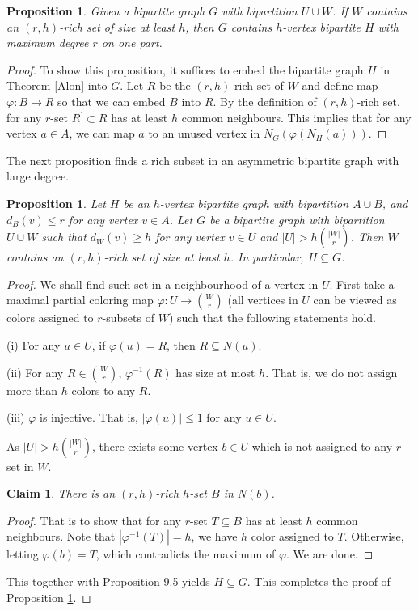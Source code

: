 \documentclass{article}
\newtheorem{claim}[theorem]{Claim}
\newtheorem{proposition}[theorem]{Proposition}
\theoremstyle{definition}
\renewcommand{\phi}{\varphi}
\begin{document}
\begin{proposition}
    Given   a bipartite graph $G$  with bipartition $U\cup W$. If $W$ contains an $(r,h)$-rich  set of size at least $h$, then $G$ contains  $h$-vertex bipartite $H$ with maximum degree $r$ on one part. 
\end{proposition}
\begin{proof}
   To show this proposition, it suffices to embed  the bipartite graph $H$ in Theorem  \ref{Alon} into $G$. Let $R$ be the  $(r,h)$-rich  set of $W$ and define map $\phi: B\rightarrow R$ so that we can embed  $B$ into $R$. By the definition of  $(r,h)$-rich  set, for any $r$-set $R^\prime \subset R$ has at least $h$ common neighbours. This implies that  for any vertex $a\in A$, we can map $a$ to an unused vertex in $N_G(\phi(N_H(a)))$. 
\end{proof}

The next proposition finds a rich subset in an asymmetric bipartite graph with large degree.

\begin{proposition}\label{embedH}
    Let $H$ be an $h$-vertex bipartite graph with bipartition $A\cup B$, and $d_B(v)\leq r$ for any vertex $v\in A$.  Let $G$ be a bipartite graph with bipartition $U\cup W$ such that $d_W(v)\geq h$ for any vertex $v\in U$ and $|U|> h \binom{|W|}{r}$. Then $W$ contains an $(r,h)$-rich  set of size at least $h$. In particular, $H\subseteq G$.
\end{proposition}
\begin{proof}
 We shall find such set in a neighbourhood of a vertex in $U$. First take a maximal partial coloring map $\phi: U\rightarrow \binom{W}{r}$ (all vertices in $U$ can be viewed as colors assigned to $r$-subsets of $W$) such that the following statements hold.

    (i) For any $u\in U$, if $\phi(u)=R$, then $R\subseteq N(u)$.

    (ii) For any $R\in \binom{W}{r}$, $\phi^{-1}(R)$ has size at most $h$. That is, we do not assign more than $h$ colors to any $R$.

    (iii) $\phi$ is injective. That is, $|\phi(u)|\leq 1$ for any $u\in U$. 

    As $|U|> h \binom{|W|}{r}$, there exists some vertex $b\in U$ which is not assigned to any $r$-set in $W$. 

    \begin{claim}
    There is an  $(r,h)$-rich $h$-set $B$ in $N(b)$.   
    \end{claim}
    \begin{proof}
  That is to show that for any $r$-set $T\subseteq B$ has at least $h$ common neighbours. Note that $|\phi^{-1}(T)|=h$, we have $h$ color assigned to $T$. Otherwise, letting $\phi(b)=T$, which contradicts the maximum of $\phi$. We are done. 
    \end{proof}
    This together with  Proposition 9.5 yields $H\subseteq G$. This completes the proof of Proposition \ref{embedH}.
\end{proof}
\end{document}
